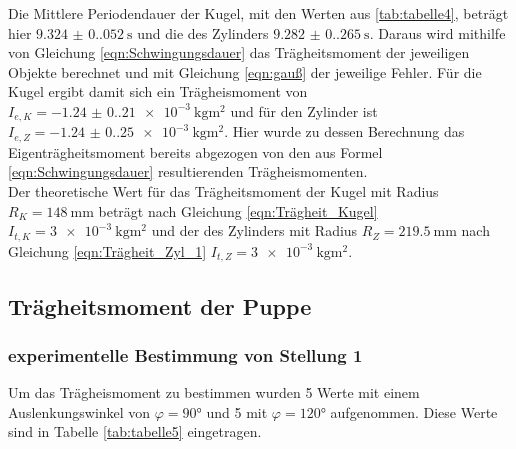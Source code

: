   Die Mittlere Periodendauer der Kugel, mit den Werten aus \ref{tab:tabelle4}, beträgt hier $\qty{9.324(0.052)}{\second}$ und die des Zylinders $\qty{9.282(0.265)}{\second}$.
  Daraus wird mithilfe von Gleichung \ref{eqn:Schwingungsdauer} das Trägheitsmoment der jeweiligen Objekte berechnet und mit Gleichung \ref{eqn:gauß} der jeweilige Fehler.
  Für die Kugel ergibt damit sich ein Trägheismoment von $I_{e,K}=\qty{-1.24(0.21)e-3}{\kilo\gram\meter\squared}$ und für den
  Zylinder ist $I_{e,Z}=\qty{-1.24(0.25)e-3}{\kilo\gram\meter\squared}$. Hier wurde zu dessen Berechnung das Eigenträgheitsmoment
  bereits abgezogen von den aus Formel \ref{eqn:Schwingungsdauer} resultierenden Trägheismomenten.\\
  Der theoretische Wert für das Trägheitsmoment der Kugel mit Radius $R_K=\qty{148}{\milli\meter}$ beträgt nach Gleichung \ref{eqn:Trägheit_Kugel} $I_{t,K}=\qty{3e-3}{\kilo\gram\meter\squared}$
  und der des Zylinders mit Radius $R_Z=\qty{219.5}{\milli\meter}$ nach Gleichung \ref{eqn:Trägheit_Zyl_1} $I_{t,Z}=\qty{3e-3}{\kilo\gram\meter\squared}$.
  
  \subsection{Trägheitsmoment der Puppe}
    \subsubsection{experimentelle Bestimmung von Stellung 1}
    Um das Trägheismoment zu bestimmen wurden 5 Werte mit einem Auslenkungswinkel von $\varphi=90°$ und 5 mit $\varphi=120°$ aufgenommen.
    Diese Werte sind in Tabelle \ref{tab:tabelle5} eingetragen.

